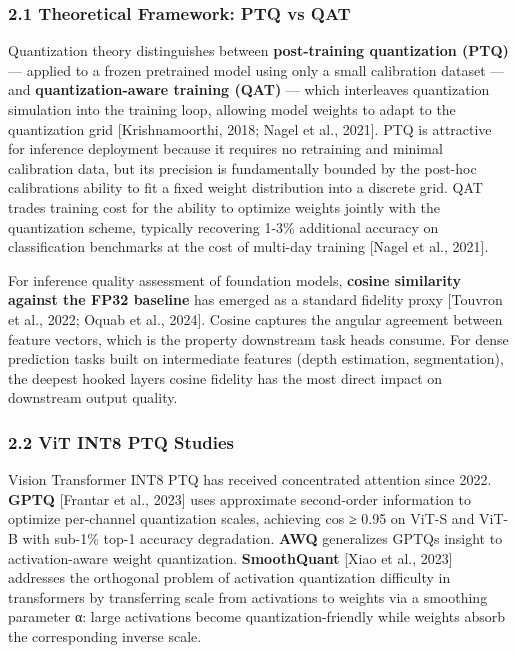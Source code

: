 \documentclass[
]{article}
\begin{document}
\subsubsection{2.1 Theoretical Framework: PTQ vs
QAT}\label{21-theoretical-framework-ptq-vs-qat}

Quantization theory distinguishes between \textbf{post-training
quantization (PTQ)} --- applied to a frozen pretrained model using only
a small calibration dataset --- and \textbf{quantization-aware training
(QAT)} --- which interleaves quantization simulation into the training
loop, allowing model weights to adapt to the quantization grid
{[}Krishnamoorthi, 2018; Nagel et al., 2021{]}. PTQ is attractive for
inference deployment because it requires no retraining and minimal
calibration data, but its precision is fundamentally bounded by the
post-hoc calibration\textquotesingle s ability to fit a fixed weight
distribution into a discrete grid. QAT trades training cost for the
ability to optimize weights jointly with the quantization scheme,
typically recovering 1-3\% additional accuracy on classification
benchmarks at the cost of multi-day training {[}Nagel et al., 2021{]}.

For inference quality assessment of foundation models, \textbf{cosine
similarity against the FP32 baseline} has emerged as a standard fidelity
proxy {[}Touvron et al., 2022; Oquab et al., 2024{]}. Cosine captures
the angular agreement between feature vectors, which is the property
downstream task heads consume. For dense prediction tasks built on
intermediate features (depth estimation, segmentation), the deepest
hooked layer\textquotesingle s cosine fidelity has the most direct
impact on downstream output quality.

\subsubsection{2.2 ViT INT8 PTQ Studies}\label{22-vit-int8-ptq-studies}

Vision Transformer INT8 PTQ has received concentrated attention since
2022. \textbf{GPTQ} {[}Frantar et al., 2023{]} uses approximate
second-order information to optimize per-channel quantization scales,
achieving cos ≥ 0.95 on ViT-S and ViT-B with sub-1\% top-1 accuracy
degradation. \textbf{AWQ} generalizes GPTQ\textquotesingle s insight to
activation-aware weight quantization. \textbf{SmoothQuant} {[}Xiao et
al., 2023{]} addresses the orthogonal problem of activation quantization
difficulty in transformers by transferring scale from activations to
weights via a smoothing parameter α: large activations become
quantization-friendly while weights absorb the corresponding inverse
scale.
\end{document}
